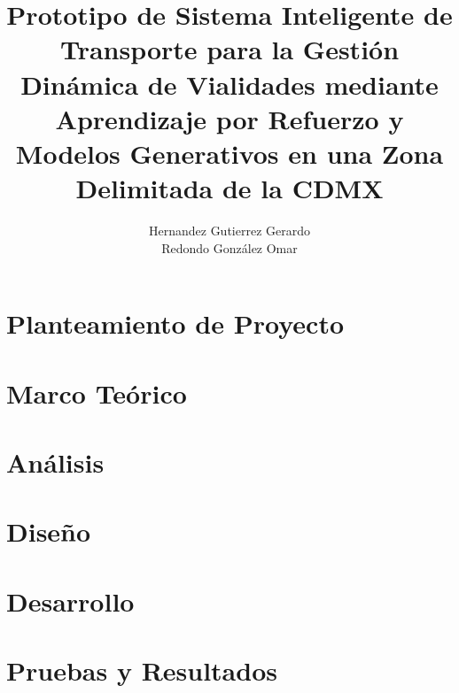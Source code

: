 \documentclass{ipn}
\author{Hernandez Gutierrez Gerardo \\ Redondo González Omar}
\title{Prototipo de Sistema Inteligente de Transporte para la Gestión Dinámica de Vialidades mediante Aprendizaje por Refuerzo y Modelos Generativos en una Zona Delimitada de la CDMX}
\begin{document}
\frontmatter
    \maketitle
    
    
    
    \tableofcontents
    \listoffigures
    \listoftables
    \listofalgorithms

\mainmatter
   \chapter{Planteamiento de Proyecto}
    

    \chapter{Marco Teórico}
    

    \chapter{Análisis}
    

    \chapter{Diseño}
    

    \chapter{Desarrollo}
    

    \chapter{Pruebas y Resultados}
    

    \appendix
        
        

\backmatter
    \printbibliography[heading=bibintoc]
\end{document}
